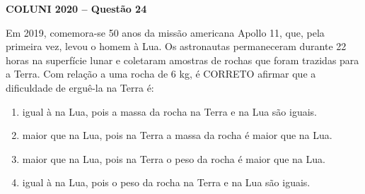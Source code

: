 \textbf{COLUNI 2020 -- Questão 24}\par\medskip Em 2019, comemora-se 50 anos da missão americana Apollo 11, que, pela primeira vez, levou o homem à Lua. Os astronautas permaneceram durante 22 horas na superfície lunar e coletaram amostras de rochas que foram trazidas para a Terra. Com relação a uma rocha de 6 kg, é CORRETO afirmar que a dificuldade de erguê-la na Terra é:\begin{enumerate}
\item igual à na Lua, pois a massa da rocha na Terra e na Lua são iguais.
\item maior que na Lua, pois na Terra a massa da rocha é maior que na Lua.
\item maior que na Lua, pois na Terra o peso da rocha é maior que na Lua.
\item igual à na Lua, pois o peso da rocha na Terra e na Lua são iguais.\end{enumerate}
